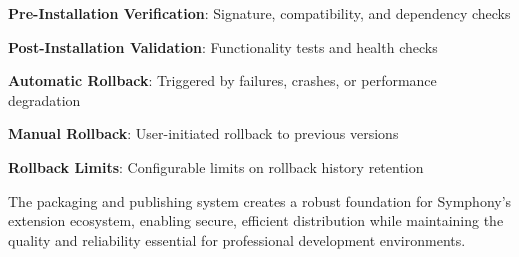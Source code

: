 \begin{compactlist}
\item \textbf{Pre-Installation Verification}: Signature, compatibility, and dependency checks
\item \textbf{Post-Installation Validation}: Functionality tests and health checks
\item \textbf{Automatic Rollback}: Triggered by failures, crashes, or performance degradation
\item \textbf{Manual Rollback}: User-initiated rollback to previous versions
\item \textbf{Rollback Limits}: Configurable limits on rollback history retention
\end{compactlist}

The packaging and publishing system creates a robust foundation for Symphony's extension ecosystem, enabling secure, efficient distribution while maintaining the quality and reliability essential for professional development environments.